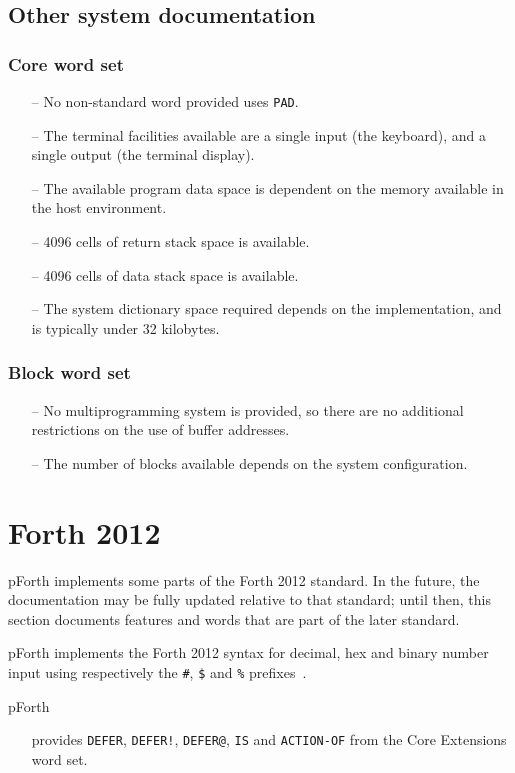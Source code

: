 \documentclass[english]{article}
\begin{document}
\subsection{Other system documentation}

\subsubsection{Core word set}

\begin{itemize}
\item[--]No non-standard word provided uses {\tt PAD}.
\item[--]The terminal facilities available are a single input (the keyboard), and a single output (the terminal display).
\item[--]The available program data space is dependent on the memory available in the host environment.
\item[--]4096 cells of return stack space is available.
\item[--]4096 cells of data stack space is available.
\item[--]The system dictionary space required depends on the implementation, and is typically under 32 kilobytes.
\end{itemize}

\subsubsection{Block word set}

\begin{itemize}
\item[--]No multiprogramming system is provided, so there are no additional restrictions on the use of buffer addresses.
\item[--]The number of blocks available depends on the system configuration.
\end{itemize}


\section{Forth 2012}
\label{forth2012}

pForth implements some parts of the Forth 2012 standard. In the future, the documentation may be fully updated relative to that standard; until then, this section documents features and words that are part of the later standard.

pForth implements the Forth 2012 syntax for decimal, hex and binary number input using respectively the {\tt \#}, {\tt \$} and {\tt \%} prefixes~\cite[section 3.4.1.3 “Text interpreter input number conversion”]{forth2012}.

pForth
\vspace{-3mm}
\begin{itemize}
\item[]provides {\tt DEFER}, {\tt DEFER!}, {\tt DEFER@}, {\tt IS} and {\tt ACTION-OF} from the Core Extensions word set.
\end{itemize}




\end{document}
